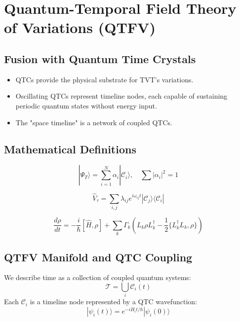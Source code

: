 \documentclass{article}
\theoremstyle{plain}
\theoremstyle{claimstyle}
\begin{document}
\section{Quantum-Temporal Field Theory of Variations (QTFV)}

\subsection{Fusion with Quantum Time Crystals}
\begin{itemize}
    \item QTCs provide the physical substrate for TVT’s variations.
    \item Oscillating QTCs represent timeline nodes, each capable of sustaining periodic quantum states without energy input.
    \item The "space timeline" is a network of coupled QTCs.
\end{itemize}

\subsection{Mathematical Definitions}
\begin{equation}
|\Psi_T\rangle = \sum_{i=1}^N \alpha_i |\mathcal{C}_i\rangle, \quad \sum |\alpha_i|^2 = 1
\end{equation}

\begin{equation}
\hat{V}_\tau = \sum_{i,j} \lambda_{ij} e^{i\omega_{ij}t} |\mathcal{C}_j\rangle \langle\mathcal{C}_i|
\end{equation}

\begin{equation}
\frac{d\rho}{dt} = -\frac{i}{\hbar}[\hat{H},\rho] + \sum_k \Gamma_k (L_k \rho L_k^\dagger - \frac{1}{2}\{L_k^\dagger L_k, \rho\})
\end{equation}
\subsection{QTFV Manifold and QTC Coupling}

We describe time as a collection of coupled quantum systems:
\begin{equation}
\mathcal{T} = \bigcup_i \mathcal{C}_i(t)
\end{equation}
Each \( \mathcal{C}_i \) is a timeline node represented by a QTC wavefunction:
\begin{equation}
|\psi_i(t)\rangle = e^{-iH_it/\hbar} |\psi_i(0)\rangle
\end{equation}
\end{document}
